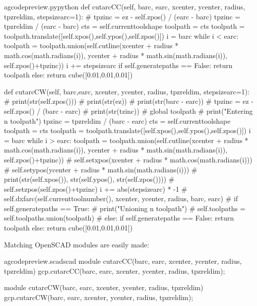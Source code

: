 \documentclass{ltxdoc}
\begin{document}
\lstset{firstnumber=\thegcpy}
\begin{writecode}{a}{gcodepreview.py}{python}
    def cutarcCC(self, barc, earc, xcenter, ycenter, radius, tpzreldim, stepsizearc=1):
#        tpzinc = ez - self.zpos() / (earc - barc)
        tpzinc = tpzreldim / (earc - barc)
        cts = self.currenttoolshape
        toolpath = cts
        toolpath = toolpath.translate([self.xpos(),self.ypos(),self.zpos()])
        i = barc
        while i < earc: 
            toolpath = toolpath.union(self.cutline(xcenter + radius * math.cos(math.radians(i)), ycenter + radius * math.sin(math.radians(i)), self.zpos()+tpzinc))
            i += stepsizearc
        if self.generatepaths == False:
            return toolpath
        else:
            return cube([0.01,0.01,0.01])

    def cutarcCW(self, barc,earc, xcenter, ycenter, radius, tpzreldim, stepsizearc=1):
#        print(str(self.zpos()))
#        print(str(ez))
#        print(str(barc - earc))
#        tpzinc = ez - self.zpos() / (barc - earc)
#        print(str(tzinc))
#        global toolpath
#        print("Entering n toolpath")
        tpzinc = tpzreldim / (barc - earc)
        cts = self.currenttoolshape
        toolpath = cts
        toolpath = toolpath.translate([self.xpos(),self.ypos(),self.zpos()])
        i = barc
        while i > earc: 
            toolpath = toolpath.union(self.cutline(xcenter + radius * math.cos(math.radians(i)), ycenter + radius * math.sin(math.radians(i)), self.zpos()+tpzinc))
#            self.setxpos(xcenter + radius * math.cos(math.radians(i)))
#            self.setypos(ycenter + radius * math.sin(math.radians(i)))
#            print(str(self.xpos()), str(self.ypos(), str(self.zpos())))
#            self.setzpos(self.zpos()+tpzinc)
            i += abs(stepsizearc) * -1
#        self.dxfarc(self.currenttoolnumber(), xcenter, ycenter, radius, barc, earc)
#        if self.generatepaths == True:
#            print("Unioning n toolpath")
#            self.toolpaths = self.toolpaths.union(toolpath)
#        else:
        if self.generatepaths == False:
            return toolpath
        else:
            return cube([0.01,0.01,0.01])

\end{writecode}
\addtocounter{gcpy}{51}

Matching OpenSCAD modules are easily made:

\lstset{firstnumber=\thegcpscad}
\begin{writecode}{a}{gcodepreview.scad}{scad}
module cutarcCC(barc, earc, xcenter, ycenter, radius, tpzreldim){
    gcp.cutarcCC(barc, earc, xcenter, ycenter, radius, tpzreldim);
}

module cutarcCW(barc, earc, xcenter, ycenter, radius, tpzreldim){
    gcp.cutarcCW(barc, earc, xcenter, ycenter, radius, tpzreldim);
}

\end{writecode}
\addtocounter{gcpscad}{8}
\end{document}
